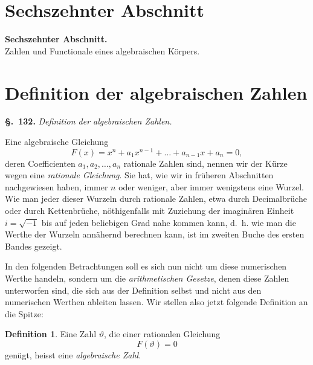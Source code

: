 \documentclass[12pt,a4paper]{article}
\theoremstyle{definition}
\newtheorem*{definition}{Definition}
\begin{document}
\newpage
\section*{Sechszehnter Abschnitt}

\begin{center}
{\Large\bfseries Sechszehnter Abschnitt.}\\[0.5em]
{\large Zahlen und Functionale eines algebraischen Körpers.}
\end{center}

\bigskip

\section{Definition der algebraischen Zahlen}\label{sec:132}

\noindent\textbf{\S.~132.}\quad
\textit{Definition der algebraischen Zahlen.}\par\medskip

Eine algebraische Gleichung
\[
F(x) = x^n + a_1 x^{n-1} + \dots + a_{n-1}x + a_n = 0,
\]
deren Coefficienten $a_1,a_2,\dots,a_n$ rationale Zahlen sind, nennen wir der Kürze wegen eine \emph{rationale Gleichung}. Sie hat, wie wir in früheren Abschnitten nachgewiesen haben, immer $n$ oder weniger, aber immer wenigstens eine Wurzel. Wie man jeder dieser Wurzeln durch rationale Zahlen, etwa durch Decimalbrüche oder durch Kettenbrüche, nöthigenfalls mit Zuziehung der imaginären Einheit $i=\sqrt{-1}$ bis auf jeden beliebigen Grad nahe kommen kann, d.~h. wie man die Werthe der Wurzeln annähernd berechnen kann, ist im zweiten Buche des ersten Bandes gezeigt.

In den folgenden Betrachtungen soll es sich nun nicht um diese numerischen Werthe handeln, sondern um die \emph{arithmetischen Gesetze}, denen diese Zahlen unterworfen sind, die sich aus der Definition selbst und nicht aus den numerischen Werthen ableiten lassen. Wir stellen also jetzt folgende Definition an die Spitze:

\begin{definition}
Eine Zahl $\vartheta$, die einer rationalen Gleichung
\begin{equation}\label{eq:132-1}
F(\vartheta)=0
\end{equation}
genügt, heisst eine \emph{algebraische Zahl}.
\end{definition}
\end{document}
